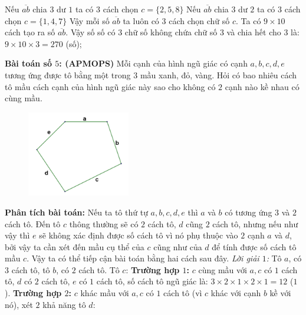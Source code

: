 \begin{multicols}{2}
\begin{multicols}{2}
		\vskip 0.1cm
		Nếu $\overline{ab}$ chia $3$ dư $1$ ta có $3$ cách chọn $c=\{2,5,8\}$
		\vskip 0.1cm
		Nếu $\overline{ab}$ chia $3$ dư $2$ ta có $3$ cách chọn $c=\{1,4,7\}$
		\vskip 0.1cm
		Vậy mỗi số $\overline{ab}$ ta luôn có $3$ cách chọn chữ số $c$.
		\vskip 0.1cm
		Ta có $9\times 10$ cách tạo ra số $\overline{ab}$.
		\vskip 0.1cm
		Vậy số số có $3$ chữ số không chứa chữ số $3$ và chia hết cho $3$ là: $9\times10\times3=270$ (số);
	\end{multicols}
	\vskip 0.1cm
	\textbf{Bài toán số $5$: (APMOPS)}
	\vskip 0.1cm
	Mỗi cạnh của hình ngũ giác có cạnh $a,b,c,d,e$ tương ứng được tô bằng một trong $3$ mầu xanh, đỏ, vàng. Hỏi có bao nhiêu cách tô mầu cách cạnh của hình ngũ giác này sao cho không có $2$ cạnh nào kề nhau có cùng mầu.
	\begin{multicols}{2}
		\begin{figure}[H]
			\centering
			\vspace*{-10pt}
			\captionsetup{labelformat=empty, justification=centering}
			\includegraphics[width=0.4\textwidth]{_8}
			\vspace*{-5pt}
		\end{figure}
		\textbf{Phân tích bài toán:} Nếu ta tô thứ tự $a,b,c,d,e$ thì $a$ và $b$ có tương ứng $3$ và $2$ cách tô. Đến tô $c$ thông thường sẽ có $2$ cách tô, $d$ cũng $2$ cách tô, nhưng nếu như vậy thì $e$ sẽ không xác định được số cách tô vì nó phụ thuộc vào $2$ cạnh $a$ và $d$, bởi vậy ta cần xét đến mầu cụ thể của $c$ cũng như của $d$ để tính được số cách tô mầu $c$. Vậy ta có thể tiếp cận bài toán bằng hai cách sau đây.
		\vskip 0.1cm
		\textit{Lời giải $1$:}
		\vskip 0.1cm
		Tô $a$, có $3$ cách tô, tô $b$, có $2$ cách tô.
		\vskip 0.1cm
		Tô $c$:
		\vskip 0.1cm
		\textbf{Trường hợp $1$:} $c$ cùng mầu với $a, c$ có $1$ cách tô, $d$ có $2$ cách tô, $e$ có $1$ cách tô, số cách tô ngũ giác là: $3\times2\times1\times2\times1=12$ ($1$).
		\vskip 0.1cm
		\textbf{Trường hợp $2$:} $c$ khác mầu với $a, c$ có $1$ cách tô (vì $c$ khác với cạnh $b$ kề với nó), xét $2$ khả năng tô $d$:

\end{multicols}
\end{multicols}
